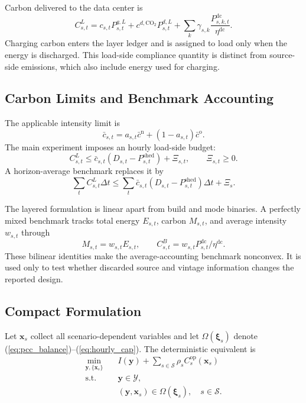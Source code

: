 \documentclass[times]{elsarticle}
\begin{document}
Carbon delivered to the data center is
\begin{equation}
C^L_{s,t}=c_{s,t}P^{g,L}_{s,t}
+c^{d,\mathrm{CO_2}}P^{d,L}_{s,t}
+\sum_k\gamma_{s,k}\frac{P^{\mathrm{dc}}_{s,k,t}}{\eta^{\mathrm{dc}}}.
\label{eq:delivered_carbon}
\end{equation}
Charging carbon enters the layer ledger and is assigned to load only when the
energy is discharged. This load-side compliance quantity is distinct from
source-side emissions, which also include energy used for charging.

\subsection{Carbon Limits and Benchmark Accounting}

The applicable intensity limit is
\begin{equation}
\bar c_{s,t}=a_{s,t}\bar c^{\mathrm n}+(1-a_{s,t})\bar c^{\mathrm o}.
\label{eq:applicable_cap}
\end{equation}
The main experiment imposes an hourly load-side budget:
\begin{equation}
C^L_{s,t}\le
\bar c_{s,t}(D_{s,t}-P^{\mathrm{shed}}_{s,t})+\Xi_{s,t},
\qquad \Xi_{s,t}\ge0.
\label{eq:hourly_cap}
\end{equation}
A horizon-average benchmark replaces it by
\begin{equation}
\sum_tC^L_{s,t}\Delta t\le
\sum_t\bar c_{s,t}(D_{s,t}-P^{\mathrm{shed}}_{s,t})\Delta t+\Xi_s.
\label{eq:horizon_cap}
\end{equation}

The layered formulation is linear apart from build and mode binaries. A
perfectly mixed benchmark tracks total energy $E_{s,t}$, carbon $M_{s,t}$, and
average intensity $w_{s,t}$ through
\begin{equation}
M_{s,t}=w_{s,t}E_{s,t},\qquad
C^B_{s,t}=w_{s,t}P^{\mathrm{dc}}_{s,t}/\eta^{\mathrm{dc}}.
\label{eq:average_model}
\end{equation}
These bilinear identities make the average-accounting benchmark nonconvex. It
is used only to test whether discarded source and vintage information changes
the reported design.

\subsection{Compact Formulation}

Let $\bm x_s$ collect all scenario-dependent variables and let
$\Omega(\bm\xi_s)$ denote
(\ref{eq:pcc_balance})--(\ref{eq:hourly_cap}). The deterministic equivalent is
\begin{equation}
\begin{aligned}
\min_{\bm y,\{\bm x_s\}}\quad
&I(\bm y)+\sum_{s\in\mathcal S}\rho_sC_s^{\mathrm{op}}(\bm x_s)\\
\mathrm{s.t.}\quad
&\bm y\in\mathcal Y,\\
&(\bm y,\bm x_s)\in\Omega(\bm\xi_s),\quad s\in\mathcal S.
\end{aligned}
\label{eq:deterministic_equivalent}
\end{equation}
\end{document}
